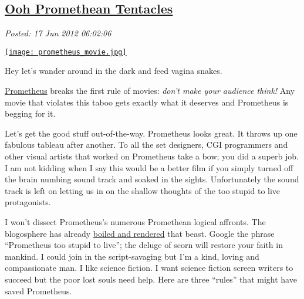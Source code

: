 %

\subsection*{\href{https://bakerjd99.wordpress.com/2012/06/17/ooh-promethean-tentacles/}{Ooh Promethean Tentacles}}


\noindent\emph{Posted: 17 Jun 2012 06:02:06}
\vspace{6pt}



\captionsetup[floatingfigure]{labelformat=empty}
\begin{floatingfigure}[r]{0.35\textwidth}
\centering
\href{http://www.prometheus-movie.com/}{\texttt{[image: prometheus\_movie.jpg]}}
\caption{Hey let's wander around in the dark and feed vagina snakes.}
\label{fig:2950X0}
\end{floatingfigure} \href{http://www.prometheus-movie.com/}{Prometheus} breaks the first
rule of movies: \emph{don't make your audience think!} Any movie that
violates this taboo gets exactly what it deserves and Prometheus is
begging for it.

Let's get the good stuff out-of-the-way. Prometheus looks great. It
throws up one fabulous tableau after another. To all the set designers,
CGI programmers and other visual artists that worked on Prometheus take
a bow; you did a superb job. I am not kidding when I say this would be a
better film if you simply turned off the brain numbing sound track and
soaked in the sights. Unfortunately the sound track is left on letting
us in on the shallow thoughts of the too stupid to live protagonists.

I won't dissect Prometheus's numerous Promethean logical affronts. The
blogosphere has already
\href{http://m15m.livejournal.com/23209.html}{boiled and rendered} that
beast. Google the phrase ``Prometheus too stupid to live''; the deluge
of scorn will restore your faith in mankind. I could join in the
script-savaging but I'm a kind, loving and compassionate man. I like
science fiction. I want science fiction screen writers to succeed but
the poor lost souls need help. Here are three ``rules'' that might have
saved Prometheus.

